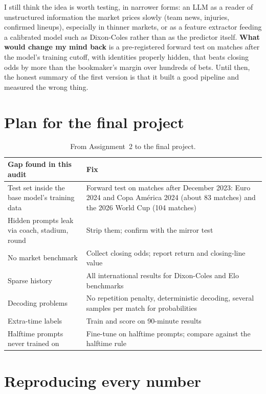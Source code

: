 \documentclass[10pt,letterpaper]{article}
\begin{document}
I still think the idea is worth testing, in narrower forms: an LLM as a reader of
unstructured information the market prices slowly (team news, injuries, confirmed lineups),
especially in thinner markets, or as a feature extractor feeding a calibrated model such as
Dixon-Coles rather than as the predictor itself. \textbf{What would change my mind back} is
a pre-registered forward test on matches after the model's training cutoff, with identities
properly hidden, that beats closing odds by more than the bookmaker's margin over hundreds
of bets. Until then, the honest summary of the first version is that it built a good
pipeline and measured the wrong thing.

\section{Plan for the final project}

\begin{table}[t]
\small
\caption{From Assignment~2 to the final project.}
\begin{tabularx}{\textwidth}{@{}P{5.2cm}Y@{}}
\toprule
Gap found in this audit & Fix \\
\midrule
Test set inside the base model's training data &
  Forward test on matches after December 2023: Euro 2024 and Copa Am\'erica 2024 (about 83
  matches) and the 2026 World Cup (104 matches) \\
Hidden prompts leak via coach, stadium, round & Strip them; confirm with the mirror test \\
No market benchmark & Collect closing odds; report return and closing-line value \\
Sparse history & All international results for Dixon-Coles and Elo benchmarks \\
Decoding problems & No repetition penalty, deterministic decoding, several samples per match for probabilities \\
Extra-time labels & Train and score on 90-minute results \\
Halftime prompts never trained on & Fine-tune on halftime prompts; compare against the halftime rule \\
\bottomrule
\end{tabularx}
\end{table}

\section{Reproducing every number}
\end{document}
